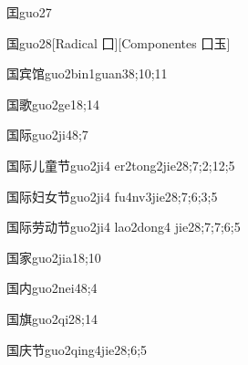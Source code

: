 \begin{verbete}{囯}{guo2}{7}
\end{verbete}

\begin{verbete}{国}{guo2}{8}[Radical ⼞][Componentes ⼞⽟]
\end{verbete}

\begin{verbete}{国宾馆}{guo2bin1guan3}{8;10;11}
\end{verbete}

\begin{verbete}{国歌}{guo2ge1}{8;14}
\end{verbete}

\begin{verbete}{国际}{guo2ji4}{8;7}
\end{verbete}

\begin{verbete}{国际儿童节}{guo2ji4 er2tong2jie2}{8;7;2;12;5}
\end{verbete}

\begin{verbete}{国际妇女节}{guo2ji4 fu4nv3jie2}{8;7;6;3;5}
\end{verbete}

\begin{verbete}{国际劳动节}{guo2ji4 lao2dong4 jie2}{8;7;7;6;5}
\end{verbete}

\begin{verbete}{国家}{guo2jia1}{8;10}
\end{verbete}

\begin{verbete}{国内}{guo2nei4}{8;4}
\end{verbete}

\begin{verbete}{国旗}{guo2qi2}{8;14}
\end{verbete}

\begin{verbete}{国庆节}{guo2qing4jie2}{8;6;5}
\end{verbete}

